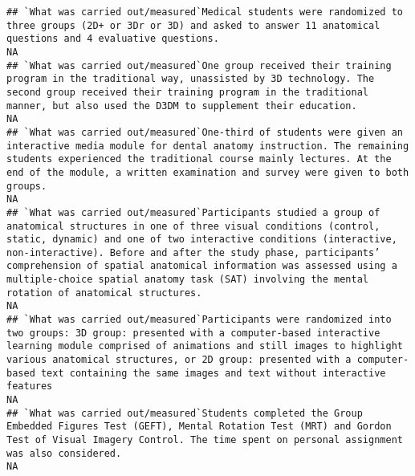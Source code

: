 \documentclass[]{article}
\begin{document}
\begin{verbatim}
## `What was carried out/measured`Medical students were randomized to three groups (2D+ or 3Dr or 3D) and asked to answer 11 anatomical questions and 4 evaluative questions.                                                                                                                                                                                                                                                                                                           NA
## `What was carried out/measured`One group received their training program in the traditional way, unassisted by 3D technology. The second group received their training program in the traditional manner, but also used the D3DM to supplement their education.                                                                                                                                                                                                                      NA
## `What was carried out/measured`One-third of students were given an interactive media module for dental anatomy instruction. The remaining students experienced the traditional course mainly lectures. At the end of the module, a written examination and survey were given to both groups.                                                                                                                                                                                         NA
## `What was carried out/measured`Participants studied a group of anatomical structures in one of three visual conditions (control, static, dynamic) and one of two interactive conditions (interactive, non-interactive). Before and after the study phase, participants’ comprehension of spatial anatomical information was assessed using a multiple-choice spatial anatomy task (SAT) involving the mental rotation of anatomical structures.                                      NA
## `What was carried out/measured`Participants were randomized into two groups: 3D group: presented with a computer-based interactive learning module comprised of animations and still images to highlight various anatomical structures, or 2D group: presented with a computer-based text containing the same images and text without interactive features                                                                                                                           NA
## `What was carried out/measured`Students completed the Group Embedded Figures Test (GEFT), Mental Rotation Test (MRT) and Gordon Test of Visual Imagery Control. The time spent on personal assignment was also considered.                                                                                                                                                                                                                                                           NA

\end{verbatim}
\end{document}
